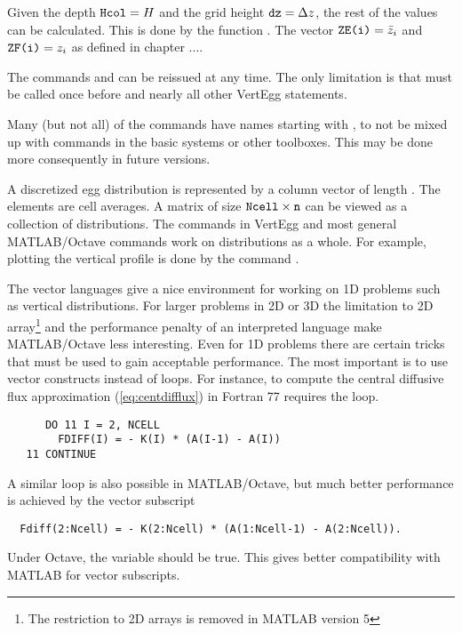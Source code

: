 Given the depth ${\mbox{\texttt{Hcol}}} = H$ and the grid height ${\mbox{\texttt{dz}}} =
\Delta z$, the rest of the values can be calculated.
This is done by the function .
The vector $\mbox{{\mbox{\texttt{ZE(i)}}}} = \bar z_i$ and 
$\mbox{{\mbox{\texttt{ZF(i)}}}} = z_i$ as defined
in chapter ....

The commands  and  can be reissued at any
time. The only limitation is that  must be called once before
 and nearly all other VertEgg statements.

Many (but not all) of the commands have names starting with ,
to not be mixed up with commands in the basic systems or other
toolboxes. This may be done more consequently in future versions.

A discretized egg distribution is represented by a column vector
of length . The elements are cell averages.
A matrix of size ${\mbox{\texttt{Ncell}}} \times {\mbox{\texttt{n}}}$
can be viewed as a collection of  distributions. The commands
in VertEgg and most general MATLAB/Octave commands work on
distributions as a whole. For example, plotting the vertical profile
is done by the command .

The vector languages give a nice environment for working on 1D
problems such as vertical distributions. For larger problems in 2D or
3D the limitation to 2D array\footnote{The restriction to 2D arrays is
removed in MATLAB version 5} and the performance penalty of an
interpreted language make MATLAB/Octave less interesting.
Even for 1D problems there are certain tricks that must be used to
gain acceptable performance. The most important is to use vector
constructs instead of loops. For instance, to compute the central
diffusive flux approximation (\ref{eq:centdifflux}) in Fortran 77
requires the loop.
\begin{verbatim}
      DO 11 I = 2, NCELL
        FDIFF(I) = - K(I) * (A(I-1) - A(I))
   11 CONTINUE
\end{verbatim}
A similar loop is also possible in MATLAB/Octave,
 but much better performance is achieved by the vector subscript
\begin{verbatim}
  Fdiff(2:Ncell) = - K(2:Ncell) * (A(1:Ncell-1) - A(2:Ncell)).
\end{verbatim}
Under Octave, the variable  should be true.
This gives better compatibility with MATLAB for vector subscripts.





